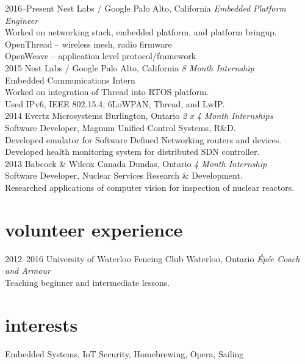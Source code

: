 \documentclass[]{eliot-cv} %
\begin{document}
\begin{entrylist}
\entry
{2016--Present}
{Nest Labs / Google}
{Palo Alto, California}
{\emph{Embedded Platform Engineer} \\
Worked on networking stack, embedded platform, and platform bringup.\\
OpenThread -- wireless mesh, radio firmware\\
OpenWeave -- application level protocol/framework\\}
\entry
{2015}
{Nest Labs / Google}
{Palo Alto, California}
{\emph{8 Month Internship} \\
Embedded Communications Intern \\
Worked on integration of Thread into RTOS platform. \\
Used IPv6, IEEE 802.15.4, 6LoWPAN, Thread, and LwIP. \\}
\entry
{2014}
{Evertz Microsystems}
{Burlington, Ontario}
{\emph{2 x 4 Month Internships} \\
Software Developer, Magnum Unified Control Systems, R\&D. \\
Developed emulator for Software Defined Networking routers and devices. \\
Developed health monitoring system for distributed SDN controller. \\}
\entry
{2013}
{Babcock \& Wilcox Canada}
{Dundas, Ontario}
{\emph{4 Month Internship} \\
Software Developer, Nuclear Services Research \& Development. \\
Researched applications of computer vision for inspection of nuclear reactors. \\}

\end{entrylist}

\section{volunteer experience}

\begin{entrylist}

\entry
{2012--2016}
{University of Waterloo Fencing Club}
{Waterloo, Ontario}
{\emph{\'{E}p\'{e}e Coach and Armour} \\
Teaching beginner and intermediate lessons. \\}

\end{entrylist}


\section{interests}
Embedded Systems, IoT Security, Homebrewing, Opera, Sailing
\end{document}

